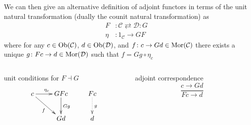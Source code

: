 \begin{frame}[t]
We can then give an alternative definition of adjoint functors in terms of the unit natural transformation (dually the counit natural transformation) as
\begin{align*}
F & \colon \mathcal{C} \rightleftarrows \mathcal{D} \colon G\\
\eta & \colon 1_{\mathcal{C}} \rightarrow GF
\end{align*}
where for any $c \in \mathop{\rm Ob}\nolimits (\mathcal{C})$, $d \in \mathop{\rm Ob}\nolimits (\mathcal{D})$, and $f \colon c \rightarrow Gd \in \mathop{\rm Mor}\nolimits(\mathcal{C})$ there exists a unique $g \colon Fc \rightarrow d \in \mathop{\rm Mor}\nolimits(\mathcal{D})$ such that $f = Gg \circ \eta_c$				
\begin{columns}[t]
    \begin{column}{0.5\textwidth}
     \begin{block}{unit conditions for $F \dashv G$}
		\abovedisplayskip=0pt
		$$
					\xymatrix{
					c \ar[r]^{\eta_c} \ar[dr]_{f} & G F c \ar[d]^{G g} & F c \ar@{.>}[d]^{g}\\
					& G d & d}
		$$
		\end{block}
    \end{column}
    \begin{column}{0.5\textwidth}
		     \begin{block}{adjoint correspondence}
		\abovedisplayskip=0pt
		$$
			\frac{c \longrightarrow Gd}{Fc \longrightarrow d}
		$$
		\end{block}
    \end{column}
\end{columns}
\end{frame}